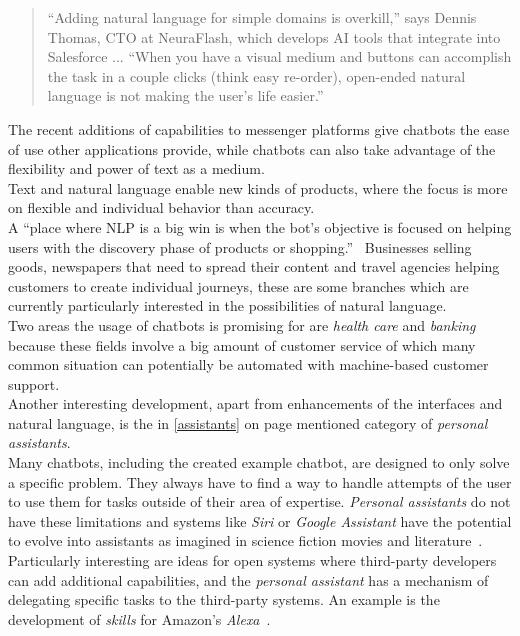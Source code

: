 \begin{quote}
“Adding natural language for simple domains is overkill,” says Dennis Thomas, CTO at NeuraFlash, which develops AI tools that integrate into Salesforce ... “When you have a visual medium and buttons can accomplish the task in a couple clicks (think easy re-order), open-ended natural language is not making the user’s life easier.”
\end{quote}

The recent additions of capabilities to messenger platforms give chatbots the ease of use other applications provide,
while chatbots can also take advantage of the flexibility and power of text as a medium.
\\

Text and natural language enable new kinds of products, where the focus is more on flexible and individual behavior than accuracy.
\\
A ``place where NLP is a big win is when the bot’s objective is focused on helping users with the discovery phase of products or shopping.''~\cite{neednlp}
Businesses selling goods, newspapers that need to spread their content and travel agencies helping customers to create individual journeys,
these are some branches which are currently particularly interested in the possibilities of natural language.
\\
Two areas the usage of chatbots is promising for are \emph{health care} and \emph{banking}~\cite{botlist}
because these fields involve a big amount of customer service of which many common situation can potentially be automated with machine-based customer support.
\\

Another interesting development, apart from enhancements of the interfaces and natural language, is the in \ref{assistants} on page \pageref{assistants} mentioned category of \emph{personal assistants}.
\\

Many chatbots, including the created example chatbot, are designed to only solve a specific problem.
They always have to find a way to handle attempts of the user to use them for tasks outside of their area of expertise.
\emph{Personal assistants} do not have these limitations
and systems like \emph{Siri} or \emph{Google Assistant} have the potential to evolve into assistants as imagined in science fiction movies and literature~\cite{assistant}.
\\

Particularly interesting are ideas for open systems where third-party developers can add additional capabilities,
and the \emph{personal assistant} has a mechanism of delegating specific tasks to the third-party systems.
An example is the development of \emph{skills} for Amazon's \emph{Alexa}~\cite{alexa}.
\\

